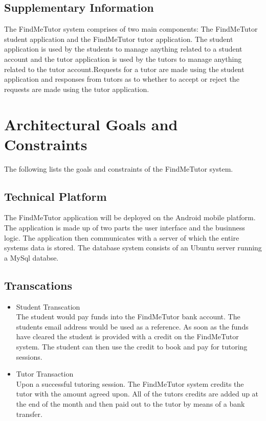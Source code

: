 \documentclass[12pt]{article}
\begin{document}
\subsection{Supplementary Information}
The FindMeTutor system comprises of two main components: The FindMeTutor student application and the FindMeTutor tutor application. The student application is used by the students to manage anything related to a student account and the tutor application is used by the tutors to manage anything related to the tutor account.Requests for a tutor are made using the student application and responses from tutors as to whether to accept or reject the requests are made using the tutor application.

\pagebreak

\section{Architectural Goals and Constraints}
The following lists the goals and constraints of the FindMeTutor system.

\subsection{Technical Platform}
The FindMeTutor application will be deployed on the Android mobile platform. The application is made up of two parts the user interface and the businness logic. The application then communicates with a server of which the entire systems data is stored. The database system consists of an Ubuntu server running a MySql databse.\\

\subsection{Transcations}

\begin{itemize}
\item Student Transcation\\
The student would pay funds into the FindMeTutor bank account. The students email address would be used as a reference. As soon as the funds have cleared the student is provided with a credit on the FindMeTutor system. The student can then use the credit to book and pay for tutoring sessions.

\item Tutor Transaction\\
Upon a successful tutoring session. The FindMeTutor system credits the tutor with the amount agreed upon. All of the tutors credits are added up at the end of the month and then paid out to the tutor by means of a bank transfer.
\end{itemize}
\end{document}
